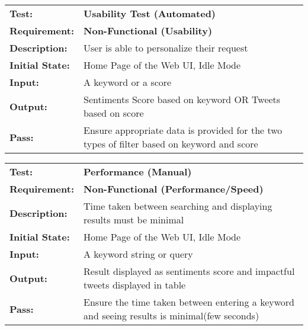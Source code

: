 \documentclass{article}
\begin{document}
	\begin{mdframed}[linewidth=1pt]%
	\begin{tabularx}{\textwidth}{@{}p{3cm}X@{}}
	{\bf Test:} & {\bf Usability Test (Automated)}\\[\baselineskip]
	{\bf Requirement:} & {\bf Non-Functional (Usability)}\\[\baselineskip]
	{\bf Description:} & User is able to personalize their request\\[0.5\baselineskip]
	{\bf Initial State:} &  Home Page of the Web UI, Idle Mode\\[0.5\baselineskip]
	{\bf Input:} &  A keyword or a score\\[0.5\baselineskip]
	{\bf Output:} & Sentiments Score based on keyword OR Tweets based on score \\[0.5\baselineskip]
	{\bf Pass:} & Ensure appropriate data is provided for the two types of filter based on keyword and score
	\end{tabularx}
	\end{mdframed}


	\begin{mdframed}[linewidth=1pt] %
	\begin{tabularx}{\textwidth}{@{}p{3cm}X@{}}
	{\bf Test:} & {\bf Performance (Manual)}\\[\baselineskip]
	{\bf Requirement:} & {\bf Non-Functional (Performance/Speed)}\\[\baselineskip]
	{\bf Description:} & Time taken between searching and displaying results must be minimal\\[0.5\baselineskip]
	{\bf Initial State:} &  Home Page of the Web UI, Idle Mode\\[0.5\baselineskip]
	{\bf Input:} &  A keyword string or query\\[0.5\baselineskip]
	{\bf Output:} & Result displayed as sentiments score and impactful tweets displayed in table\\[0.5\baselineskip]
	{\bf Pass:} & Ensure the time taken between entering a keyword and seeing results is minimal(few seconds)
	\end{tabularx}
	\end{mdframed}
	
\end{document}
